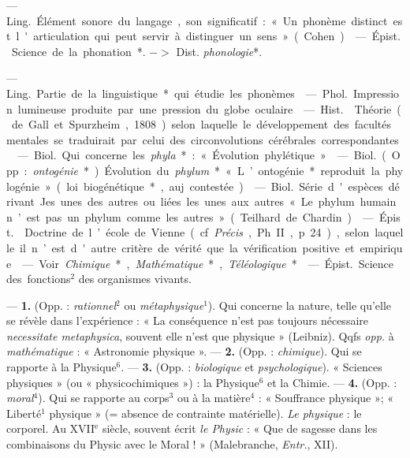 \begin{itemize}[leftmargin=1cm, label=, itemsep=1pt]
 — \si{Ling.} Élément sonore du langage, son significatif : « Un
phonème distinct est l'articulation qui peut servir à distinguer un sens
» (Cohen).

 — \si{Épist.} Science de la
phonation*. $->$ Dist. {\it phonologie}*.

 — \si{Ling.} Partie de la linguistique* qui étudie les
phonèmes.

 — \si{Phol.} Impression lumineuse produite par une pression du
globe oculaire.

 — \si{Hist.}  Théorie (de Gall et Spurzheim,
1808) selon laquelle le développement des facultés mentales se traduirait par
celui des circonvolutions cérébrales correspondantes.

 — \si{Biol.} Qui concerne les
{\it phyla}* : « Évolution phylétique ».

 — \si{Biol.} (Opp. : {\it ontogénie}*). Évolution du
{\it phylum}* « L’ontogénie* reproduit la phylogénie » (loi biogénétique*,
auj. contestée).

 — \si{Biol.} Série d'espèces dérivant Jes unes des autres ou
liées les unes aux autres « Le phylum humain n’est pas un phylum comme les
autres » (Teilhard de Chardin).

 — \si{Épist.}  Doctrine de l’école de Vienne
(cf. {\it Précis}, Ph. II, p. 24), selon laquelle il n’est d'autre critère de
vérité que la vérification positive et empirique.

 — Voir {\it Chimique}*, {\it Mathématique}*,
{\it Téléologique}*.

 — \si{Épist.} Science des
fonctions$^2$ des organismes vivants.

 — {\bf 1.} (Opp. : {\it rationnel}$^2$ ou {\it
métaphysique}$^1$). Qui concerne la nature, telle qu’elle se révèle dans
l'expérience : « La conséquence n’est pas toujours nécessaire {\it
necessitate metaphysica}, souvent elle n’est que physique » (Leibniz). Qqfs
{\it opp.} à {\it mathématique} : « Astronomie physique ». — {\bf 2.} (Opp. :
{\it chimique}). Qui se rapporte à la Physique$^6$. — {\bf 3.} (Opp. : {\it
biologique} et {\it psychologique}). « Sciences physiques » (ou «
physicochimiques ») : la Physique$^6$ et la Chimie. — {\bf 4.} (Opp. : {\it
moral}$^4$). Qui se rapporte au corps$^3$ ou à la matière$^4$ : « Souffrance
physique »; « Liberté$^1$ physique » (= absence de contrainte matérielle).
{\it Le physique} : le corporel. Au {\footnotesize XVII}$^\text{e}$ siècle,
souvent écrit {\it le Physic} : « Que de sagesse dans les combinaisons du
 Physic avec le Moral ! » (Malebranche, {\it Entr.}, XII).


\end{itemize}
